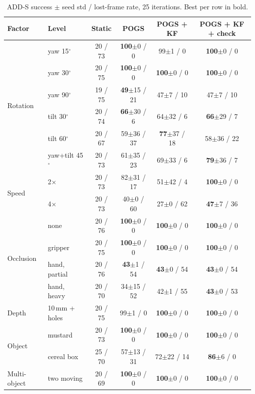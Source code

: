 \documentclass[10pt,a4paper]{article}
\newcommand{\best}[1]{\textbf{#1}}
\begin{document}
\begin{table}[H]
\centering\small
\caption{ADD-S success $\pm$ seed std / lost-frame rate, 25 iterations. Best per row in bold.}
\label{tab:factor}
\begin{tabular}{@{}llcccc@{}}
\toprule
Factor & Level & Static & POGS & POGS + KF & POGS + KF + check \\
\midrule
\multirow{6}{*}{Rotation}
 & yaw 15$^\circ$ & 20 / 73 & \best{100}$\pm$0 / 0 & 99$\pm$1 / 0 & \best{100}$\pm$0 / 0 \\
 & yaw 30$^\circ$ & 20 / 75 & \best{100}$\pm$0 / 0 & \best{100}$\pm$0 / 0 & \best{100}$\pm$0 / 0 \\
 & yaw 90$^\circ$ & 19 / 75 & \best{49}$\pm$15 / 21 & 47$\pm$7 / 10 & 47$\pm$7 / 10 \\
 & tilt 30$^\circ$ & 20 / 74 & \best{66}$\pm$30 / 6 & 64$\pm$32 / 6 & \best{66}$\pm$29 / 7 \\
 & tilt 60$^\circ$ & 20 / 67 & 59$\pm$36 / 37 & \best{77}$\pm$37 / 18 & 58$\pm$36 / 22 \\
 & yaw+tilt 45$^\circ$ & 20 / 73 & 61$\pm$35 / 23 & 69$\pm$33 / 6 & \best{79}$\pm$36 / 7 \\
\midrule
\multirow{2}{*}{Speed}
 & 2$\times$ & 20 / 73 & 82$\pm$31 / 17 & 51$\pm$42 / 4 & \best{100}$\pm$0 / 0 \\
 & 4$\times$ & 20 / 73 & 40$\pm$0 / 60 & 27$\pm$0 / 62 & \best{47}$\pm$7 / 36 \\
\midrule
\multirow{4}{*}{Occlusion}
 & none & 20 / 76 & \best{100}$\pm$0 / 0 & \best{100}$\pm$0 / 0 & \best{100}$\pm$0 / 0 \\
 & gripper & 20 / 75 & \best{100}$\pm$0 / 0 & \best{100}$\pm$0 / 0 & \best{100}$\pm$0 / 0 \\
 & hand, partial & 20 / 76 & \best{43}$\pm$1 / 54 & \best{43}$\pm$0 / 54 & \best{43}$\pm$0 / 54 \\
 & hand, heavy & 20 / 70 & 34$\pm$15 / 52 & 42$\pm$1 / 55 & \best{43}$\pm$0 / 53 \\
\midrule
Depth & 10\,mm + holes & 20 / 75 & 99$\pm$1 / 0 & \best{100}$\pm$0 / 0 & \best{100}$\pm$0 / 0 \\
\midrule
\multirow{2}{*}{Object}
 & mustard & 20 / 73 & \best{100}$\pm$0 / 0 & \best{100}$\pm$0 / 0 & \best{100}$\pm$0 / 0 \\
 & cereal box & 25 / 70 & 57$\pm$13 / 31 & 72$\pm$22 / 14 & \best{86}$\pm$6 / 0 \\
\midrule
Multi-object & two moving & 20 / 69 & \best{100}$\pm$0 / 0 & \best{100}$\pm$0 / 0 & \best{100}$\pm$0 / 0 \\
\bottomrule
\end{tabular}
\end{table}
\end{document}
